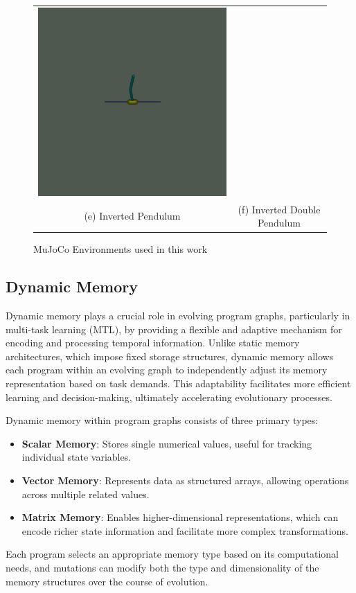 \documentclass[sigconf]{acmart}
\begin{document}
\begin{figure}[h]
\begin{tabular}{cc}
    \includegraphics[width=0.3\linewidth]{assets/inverted_double_pendulum} \\
    (e) Inverted Pendulum & (f) Inverted Double Pendulum \\
  \end{tabular}
  \caption{MuJoCo Environments used in this work}
  \label{fig:mujoco_env}
\end{figure}

\subsection{Dynamic Memory}
Dynamic memory plays a crucial role in evolving program graphs, particularly 
in multi-task learning (MTL), by providing a flexible and adaptive
mechanism for encoding and processing temporal information. Unlike static memory 
architectures, which impose fixed storage structures, dynamic memory allows each 
program within an evolving graph to independently adjust its memory representation 
based on task demands. This adaptability facilitates more efficient learning and 
decision-making, ultimately accelerating evolutionary processes.

Dynamic memory within program graphs consists of three primary types:
\begin{itemize}
  \item \textbf{Scalar Memory}: Stores single numerical values, useful for tracking individual state variables.
  \item \textbf{Vector Memory}: Represents data as structured arrays, allowing operations across multiple related values.
  \item \textbf{Matrix Memory}: Enables higher-dimensional representations, which can encode richer state information 
  and facilitate more complex transformations.
\end{itemize}

Each program selects an appropriate memory type based on its computational needs, 
and mutations can modify both the type and dimensionality of the memory structures over the course of evolution.
\end{document}
